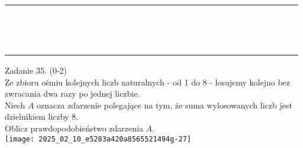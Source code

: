 \documentclass[10pt]{article}
\begin{document}
\begin{center}
\begin{tabular}{|c|c|c|c|c|c|c|c|c|c|c|c|c|c|c|c|c|c|c|c|c|c|c|c|c|c|c|c|c|c|c|}
\hline
 &  &  &  &  &  &  &  &  &  &  &  &  &  &  &  &  &  &  &  &  &  &  &  &  &  &  &  &  &  &  \\
\hline
 &  &  &  &  &  &  &  &  &  &  &  &  &  &  &  &  &  &  &  &  &  &  &  &  &  &  &  &  &  &  \\
\hline
 &  &  &  &  &  &  &  &  &  &  &  &  &  &  &  &  &  &  &  &  &  &  &  &  &  &  &  &  &  &  \\
\hline
 &  &  &  &  &  &  &  &  &  &  &  &  &  &  &  &  &  &  &  &  &  &  &  &  &  &  &  &  &  &  \\
\hline
 &  &  &  &  &  &  &  &  &  &  &  &  &  &  &  &  &  &  &  &  &  &  &  &  &  &  &  &  &  &  \\
\hline
 &  &  &  &  &  &  &  &  &  &  &  &  &  &  &  &  &  &  &  &  &  &  &  &  &  &  &  &  &  &  \\
\hline
 &  &  &  &  &  &  &  &  &  &  &  &  &  &  &  &  &  &  &  &  &  &  &  &  &  &  &  &  &  &  \\
\hline
 &  &  &  &  &  &  &  &  &  &  &  &  &  &  &  &  &  &  &  &  &  &  &  &  &  &  &  &  &  &  \\
\hline
 &  &  &  &  &  &  &  &  &  &  &  &  &  &  &  &  &  &  &  &  &  &  &  &  &  &  &  &  &  &  \\
\hline
 &  &  &  &  &  &  &  &  &  &  &  &  &  &  &  &  &  &  &  &  &  &  &  &  &  &  &  &  &  &  \\
\hline
 &  &  &  &  &  &  &  &  &  &  &  &  &  &  &  &  &  &  &  &  &  &  &  &  &  &  &  &  &  &  \\
\hline
 &  &  &  &  &  &  &  &  &  &  &  &  &  &  &  &  &  &  &  &  &  &  &  &  &  &  &  &  &  &  \\
\hline
 &  &  &  &  &  &  &  &  &  &  &  &  &  &  &  &  &  &  &  &  &  &  &  &  &  &  &  &  &  &  \\
\hline
 &  &  &  &  &  &  &  &  &  &  &  &  &  &  &  &  &  &  &  &  &  &  &  &  &  &  &  &  &  &  \\
\hline
 &  &  &  &  &  &  &  &  &  &  &  &  &  &  &  &  &  &  &  &  &  &  &  &  &  &  &  &  &  &  \\
\hline
\end{tabular}
\end{center}

Zadanie 35. (0-2)\\
Ze zbioru ośmiu kolejnych liczb naturalnych - od 1 do 8 - losujemy kolejno bez zwracania dwa razy po jednej liczbie.\\
Niech \(A\) oznacza zdarzenie polegające na tym, że suma wylosowanych liczb jest dzielnikiem liczby 8.\\
Oblicz prawdopodobieństwo zdarzenia \(A\).\\
\texttt{[image: 2025\_02\_10\_e5283a420a8565521494g-27]}
\end{document}
